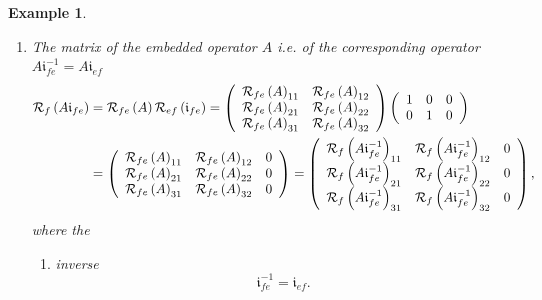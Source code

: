 \documentclass[aps,preprint]{revtex4}%
\newtheorem{example}[theorem]{Example}
\begin{document}
\begin{example}
\begin{enumerate}
\begin{enumerate}
\item The matrix of the embedded operator $A$ i.e. of the corresponding
operator $A\mathfrak{i}_{fe}^{-1}=A\mathfrak{i}_{ef}$
\begin{align}
\mathcal{R}_{f}\left(  A\mathfrak{i}_{fe}\right)   &  =\mathcal{R}_{fe}\left(
A\right)  \mathcal{R}_{ef}\left(  \mathfrak{i}_{fe}\right)  =\left(
\begin{array}
[c]{cc}%
\mathcal{R}_{fe}\left(  A\right)  _{11} & \mathcal{R}_{fe}\left(  A\right)
_{12}\\
\mathcal{R}_{fe}\left(  A\right)  _{21} & \mathcal{R}_{fe}\left(  A\right)
_{22}\\
\mathcal{R}_{fe}\left(  A\right)  _{31} & \mathcal{R}_{fe}\left(  A\right)
_{32}%
\end{array}
\right)  \left(
\begin{array}
[c]{ccc}%
1 & 0 & 0\\
0 & 1 & 0
\end{array}
\right) \\
&  =\left(
\begin{array}
[c]{ccc}%
\mathcal{R}_{fe}\left(  A\right)  _{11} & \mathcal{R}_{fe}\left(  A\right)
_{12} & 0\\
\mathcal{R}_{fe}\left(  A\right)  _{21} & \mathcal{R}_{fe}\left(  A\right)
_{22} & 0\\
\mathcal{R}_{fe}\left(  A\right)  _{31} & \mathcal{R}_{fe}\left(  A\right)
_{32} & 0
\end{array}
\right)  =\left(
\begin{array}
[c]{ccc}%
\mathcal{R}_{f}\left(  A\mathfrak{i}_{fe}^{-1}\right)  _{11} & \mathcal{R}%
_{f}\left(  A\mathfrak{i}_{fe}^{-1}\right)  _{12} & 0\\
\mathcal{R}_{f}\left(  A\mathfrak{i}_{fe}^{-1}\right)  _{21} & \mathcal{R}%
_{f}\left(  A\mathfrak{i}_{fe}^{-1}\right)  _{22} & 0\\
\mathcal{R}_{f}\left(  A\mathfrak{i}_{fe}^{-1}\right)  _{31} & \mathcal{R}%
_{f}\left(  A\mathfrak{i}_{fe}^{-1}\right)  _{32} & 0
\end{array}
\right)  ,
\end{align}
where the

\begin{enumerate}
\item[*] inverse
\begin{equation}
\mathfrak{i}_{fe}^{-1}=\mathfrak{i}_{ef}.
\end{equation}



\end{enumerate}
\end{enumerate}
\end{enumerate}
\end{example}
\end{document}
